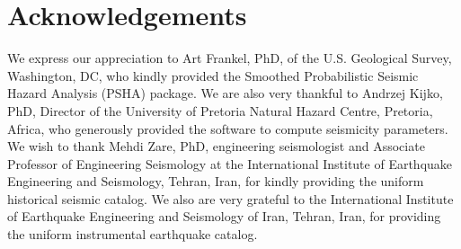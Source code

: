 \section{Acknowledgements}

 We express our appreciation to Art Frankel, PhD, of the U.S. Geological Survey, Washington, DC, who kindly provided the Smoothed Probabilistic Seismic Hazard Analysis (PSHA) package. We are also very thankful to Andrzej Kijko, PhD, Director of the University of Pretoria Natural Hazard Centre, Pretoria, Africa, who generously provided the software to compute seismicity parameters. We wish to thank Mehdi Zare, PhD, engineering seismologist and Associate Professor of Engineering Seismology at the International Institute of Earthquake Engineering and Seismology, Tehran, Iran, for  kindly providing the uniform historical seismic catalog. We also are very grateful to the International Institute of Earthquake Engineering and Seismology of Iran, Tehran, Iran, for providing the uniform instrumental earthquake catalog. 

